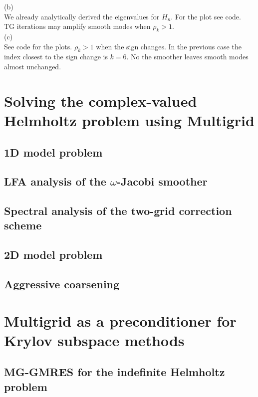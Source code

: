 \documentclass[a4paper,12pt]{article}
\begin{document}
(b) \\
We already analytically derived the eigenvalues for $H_{n}$. For the plot see code.\\
TG iterations may amplify smooth modes when $\rho_{k} >1$. \\
(c)\\
See code for the plots. $\rho_{k} >1$ when the sign changes. In the previous case the
index closest to the sign change is $k = 6$. No the smoother leaves smooth modes almost unchanged.



\section{Solving the complex-valued Helmholtz problem using Multigrid}

\subsection{1D model problem}

\subsection{LFA analysis of the $\omega$-Jacobi smoother}

\subsection{Spectral analysis of the two-grid correction scheme}

\subsection{2D model problem}

\subsection{Aggressive coarsening}

\section{Multigrid as a preconditioner for Krylov subspace methods}

\subsection{MG-GMRES for the indefinite Helmholtz problem}
\end{document}
